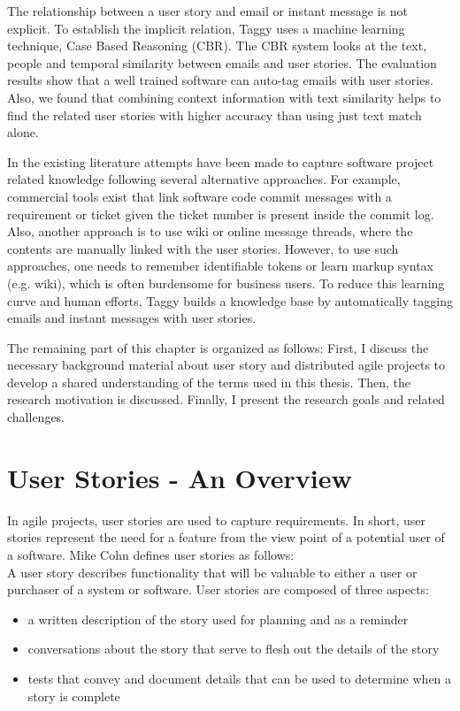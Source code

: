 The relationship between a user story and email or instant message is not explicit. To establish the implicit relation, Taggy uses a machine learning technique, Case Based Reasoning (CBR). The CBR system looks at the text, people and temporal similarity between emails and user stories. The evaluation results show that a well trained software can auto-tag emails with user stories. Also, we found that combining context information with text similarity helps to find the related user stories with higher accuracy than using just text match alone.

In the existing literature attempts have been made to capture software project related knowledge following several alternative approaches. For example, commercial tools exist that link software code commit messages with a requirement or ticket given the ticket number is present inside the commit log. Also, another approach is to use wiki or online message threads, where the contents are manually linked with the user stories. However, to use such approaches, one needs to remember identifiable tokens or learn markup syntax (e.g. wiki), which is often burdensome for business users. To reduce this learning curve and human efforts, Taggy builds a knowledge base by automatically tagging emails and instant messages with user stories. 

The remaining part of this chapter is organized as follows: First, I discuss the necessary background material about user story and distributed agile projects to develop a shared understanding of the terms used in this thesis. Then, the research motivation is discussed. Finally, I present the research goals and related challenges.

\section{User Stories - An Overview}
In agile projects, user stories are used to capture requirements. In short, user stories represent the need for a feature from the view point of a potential user of a software. Mike Cohn\cite{user_stories_applied} defines user stories as follows:\\
A user story describes functionality that will be valuable to either a user or purchaser of a system or software. User stories are composed of three aspects:
\begin{itemize}
	\item a written description of the story used for planning and as a reminder
	\item conversations about the story that serve to flesh out the details of the story
	\item tests that convey and document details that can be used to determine when a story is complete
\end{itemize}

